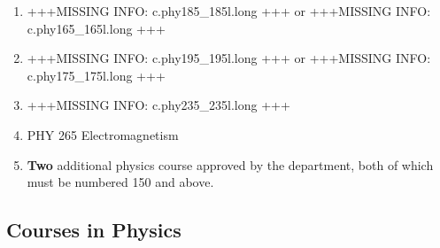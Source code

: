 \documentclass[
  letterpaper,
]{scrbook}
\begin{document}
\begin{enumerate}
\def\labelenumi{\arabic{enumi}.}
\item
  +++MISSING INFO: c.phy185\_185l.long +++ or +++MISSING INFO:
  c.phy165\_165l.long +++
\item
  +++MISSING INFO: c.phy195\_195l.long +++ or +++MISSING INFO:
  c.phy175\_175l.long +++
\item
  +++MISSING INFO: c.phy235\_235l.long +++
\item
  PHY 265 Electromagnetism
\item
  \textbf{Two} additional physics course approved by the department,
  both of which must be numbered 150 and above.
\end{enumerate}

\hypertarget{courses-in-physics}{%
\subsection{Courses in Physics}\label{courses-in-physics}}
\end{document}
